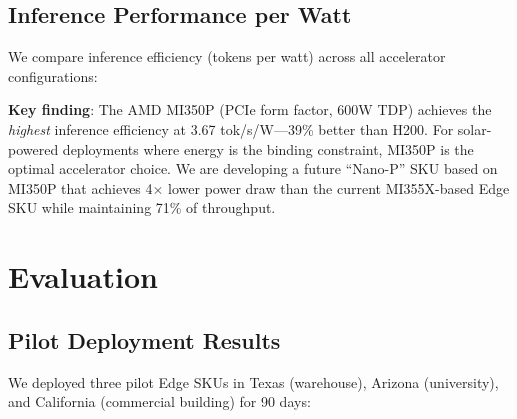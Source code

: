 \documentclass[conference,10pt,letterpaper]{IEEEtran}
\begin{document}
\subsection{Inference Performance per Watt}

We compare inference efficiency (tokens per watt) across all accelerator configurations:

\begin{table}[!t]
\caption{Inference Efficiency (Llama-70B, vLLM, batch=32)}
\label{tab:efficiency}
\centering\scriptsize
{}
\end{table}

\textbf{Key finding}: The AMD MI350P (PCIe form factor, 600W TDP) achieves the \emph{highest} inference efficiency at 3.67 tok/s/W---39\% better than H200. For solar-powered deployments where energy is the binding constraint, MI350P is the optimal accelerator choice. We are developing a future ``Nano-P'' SKU based on MI350P that achieves 4$\times$ lower power draw than the current MI355X-based Edge SKU while maintaining 71\% of throughput.

\section{Evaluation}
\label{sec:eval}

\subsection{Pilot Deployment Results}

We deployed three pilot Edge SKUs in Texas (warehouse), Arizona (university), and California (commercial building) for 90 days:
\end{document}

